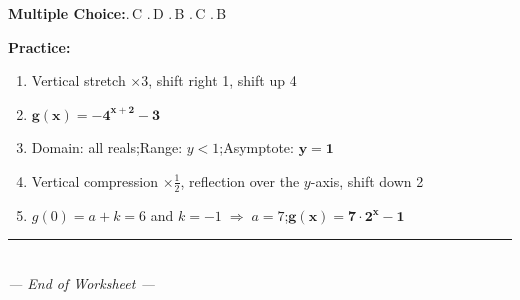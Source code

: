 \documentclass[12pt,letterpaper]{article}
\begin{document}
\smallskip
\textbf{Multiple Choice:}.\,C .\,D .\,B .\,C .\,B

\smallskip
\textbf{Practice:}
\begin{enumerate}[label=\arabic*., leftmargin=*, itemsep=3pt, topsep=2pt]
  \item Vertical stretch $\times 3$, shift right 1, shift up 4
  \item $\boldsymbol{g(x) = -4^{x+2} - 3}$
  \item Domain: all reals;\quad Range: $y < 1$;\quad Asymptote: $\boldsymbol{y=1}$
  \item Vertical compression $\times\tfrac{1}{2}$, reflection over the $y$-axis, shift down 2
  \item $g(0)=a+k=6$ and $k=-1\;\Rightarrow\; a=7$;\quad $\boldsymbol{g(x)=7\cdot 2^x-1}$
\end{enumerate}

\vspace{12pt}
\begin{center}
  \textcolor{gray}{\rule{0.5\linewidth}{0.4pt}}\\[4pt]
  \textit{\small --- End of Worksheet ---}
\end{center}
\end{document}
